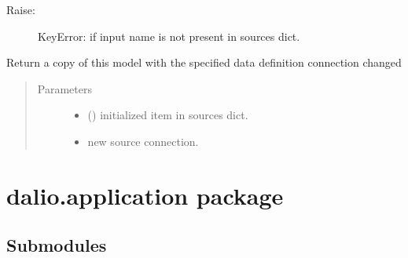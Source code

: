 \documentclass[letterpaper,10pt,english]{sphinxmanual}
\begin{document}
\begin{fulllineitems}
\begin{fulllineitems}
\begin{quote}
\begin{description}
\end{description}\end{quote}
\begin{description}
\item[{Raise:}] \leavevmode
KeyError: if input name is not present in sources dict.

\end{description}

\end{fulllineitems}


\begin{fulllineitems}
\label{\detokenize{dalio.model:dalio.model.model.Model.with_input}}
Return a copy of this model with the specified data definition
connection changed
\begin{quote}\begin{description}
\item[{Parameters}] \leavevmode\begin{itemize}
\item {} 
 () \textendash{} initialized item in sources dict.

\item {} 
 \textendash{} new source connection.

\end{itemize}

\end{description}\end{quote}

\end{fulllineitems}


\end{fulllineitems}



\chapter{dalio.application package}
\label{\detokenize{dalio.application:dalio-application-package}}\label{\detokenize{dalio.application::doc}}

\section{Submodules}
\label{\detokenize{dalio.application:submodules}}
\end{document}
